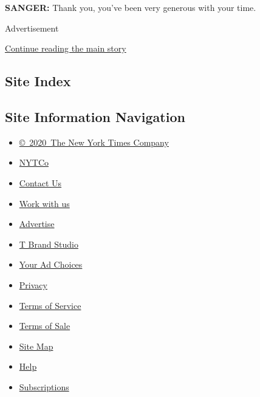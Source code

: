 \textbf{SANGER:} Thank you, you've been very generous with your time.

Advertisement

\protect\hyperlink{after-bottom}{Continue reading the main story}

\hypertarget{site-index}{%
\subsection{Site Index}\label{site-index}}

\hypertarget{site-information-navigation}{%
\subsection{Site Information
Navigation}\label{site-information-navigation}}

\begin{itemize}
\tightlist
\item
  \href{https://help.nytimes3xbfgragh.onion/hc/en-us/articles/115014792127-Copyright-notice}{©~2020~The
  New York Times Company}
\end{itemize}

\begin{itemize}
\tightlist
\item
  \href{https://www.nytco.com/}{NYTCo}
\item
  \href{https://help.nytimes3xbfgragh.onion/hc/en-us/articles/115015385887-Contact-Us}{Contact
  Us}
\item
  \href{https://www.nytco.com/careers/}{Work with us}
\item
  \href{https://nytmediakit.com/}{Advertise}
\item
  \href{http://www.tbrandstudio.com/}{T Brand Studio}
\item
  \href{https://www.nytimes3xbfgragh.onion/privacy/cookie-policy\#how-do-i-manage-trackers}{Your
  Ad Choices}
\item
  \href{https://www.nytimes3xbfgragh.onion/privacy}{Privacy}
\item
  \href{https://help.nytimes3xbfgragh.onion/hc/en-us/articles/115014893428-Terms-of-service}{Terms
  of Service}
\item
  \href{https://help.nytimes3xbfgragh.onion/hc/en-us/articles/115014893968-Terms-of-sale}{Terms
  of Sale}
\item
  \href{https://spiderbites.nytimes3xbfgragh.onion}{Site Map}
\item
  \href{https://help.nytimes3xbfgragh.onion/hc/en-us}{Help}
\item
  \href{https://www.nytimes3xbfgragh.onion/subscription?campaignId=37WXW}{Subscriptions}
\end{itemize}
